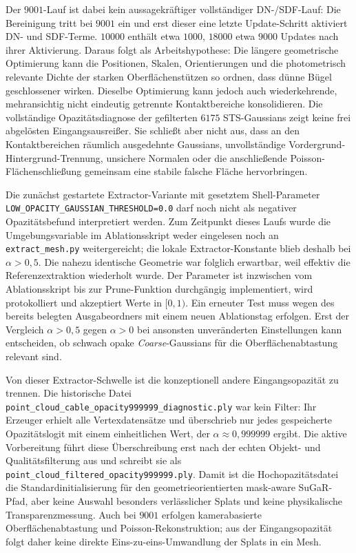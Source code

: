\documentclass[12pt,a4paper]{article}
\begin{document}
Der $9001$-Lauf ist dabei kein aussagekräftiger vollständiger DN-/SDF-Lauf: Die Bereinigung tritt bei $9001$ ein und erst dieser eine letzte Update-Schritt aktiviert DN- und SDF-Terme. $10000$ enthält etwa $1000$, $18000$ etwa $9000$ Updates nach ihrer Aktivierung. Daraus folgt als Arbeitshypothese: Die längere geometrische Optimierung kann die Positionen, Skalen, Orientierungen und die photometrisch relevante Dichte der starken Oberflächenstützen so ordnen, dass dünne Bügel geschlossener wirken. Dieselbe Optimierung kann jedoch auch wiederkehrende, mehransichtig nicht eindeutig getrennte Kontaktbereiche konsolidieren. Die vollständige Opazitätsdiagnose der gefilterten $6175$ STS-Gaussians zeigt keine frei abgelösten Eingangsausreißer. Sie schließt aber nicht aus, dass an den Kontaktbereichen räumlich ausgedehnte Gaussians, unvollständige Vordergrund-Hintergrund-Trennung, unsichere Normalen oder die anschließende Poisson-Flächenschließung gemeinsam eine stabile falsche Fläche hervorbringen.

Die zunächst gestartete Extractor-Variante mit gesetztem Shell-Parameter \texttt{LOW\_OPACITY\_GAUSSIAN\_THRESHOLD=0.0} darf noch nicht als negativer Opazitätsbefund interpretiert werden. Zum Zeitpunkt dieses Laufs wurde die Umgebungsvariable im Ablationsskript weder eingelesen noch an \texttt{extract\_mesh.py} weitergereicht; die lokale Extractor-Konstante blieb deshalb bei $\alpha>0{,}5$. Die nahezu identische Geometrie war folglich erwartbar, weil effektiv die Referenzextraktion wiederholt wurde. Der Parameter ist inzwischen vom Ablationsskript bis zur Prune-Funktion durchgängig implementiert, wird protokolliert und akzeptiert Werte in $[0,1)$. Ein erneuter Test muss wegen des bereits belegten Ausgabeordners mit einem neuen Ablationstag erfolgen. Erst der Vergleich $\alpha>0{,}5$ gegen $\alpha>0$ bei ansonsten unveränderten Einstellungen kann entscheiden, ob schwach opake \emph{Coarse}-Gaussians für die Oberflächenabtastung relevant sind.

Von dieser Extractor-Schwelle ist die konzeptionell andere Eingangsopazität zu trennen. Die historische Datei \texttt{point\_cloud\_cable\_opacity999999\_diagnostic.ply} war kein Filter: Ihr Erzeuger erhielt alle Vertexdatensätze und überschrieb nur jedes gespeicherte Opazitätslogit mit einem einheitlichen Wert, der $\alpha\approx0{,}999999$ ergibt. Die aktive Vorbereitung führt diese Überschreibung erst nach der echten Objekt- und Qualitätsfilterung aus und schreibt sie als \texttt{point\_cloud\_filtered\_opacity999999.ply}. Damit ist die Hochopazitätsdatei die Standardinitialisierung für den geometrieorientierten mask-aware SuGaR-Pfad, aber keine Auswahl besonders verlässlicher Splats und keine physikalische Transparenzmessung. Auch bei $9001$ erfolgen kamerabasierte Oberflächenabtastung und Poisson-Rekonstruktion; aus der Eingangsopazität folgt daher keine direkte Eins-zu-eins-Umwandlung der Splats in ein Mesh.
\end{document}
